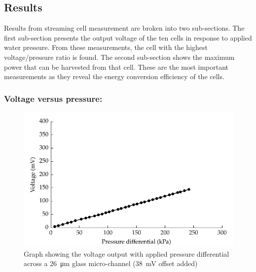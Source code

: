 \subsection{Results}

Results from streaming cell measurement are broken into two sub-sections.
The first sub-section presents the output voltage of the ten cells in response to applied water pressure.
From these measurements, the cell with the highest voltage/pressure ratio is found.
The second sub-section shows the maximum power that can be harvested from that cell.
These are the most important measurements as they reveal the energy conversion efficiency of the cells.

\subsubsection*{Voltage versus pressure:}


\begin{figure}[p]
    \centering
    \includegraphics{content/pt1/01-PowerHarvesting/graphics/streamingCell_voltVsPress_26um_out}
    \caption{\label{fig:VvsP_26um}Graph showing the voltage output with applied pressure differential across a \SI{26}{\micro\metre} glass micro-channel (\SI{38}{\milli\volt} offset added)}
\end{figure}

